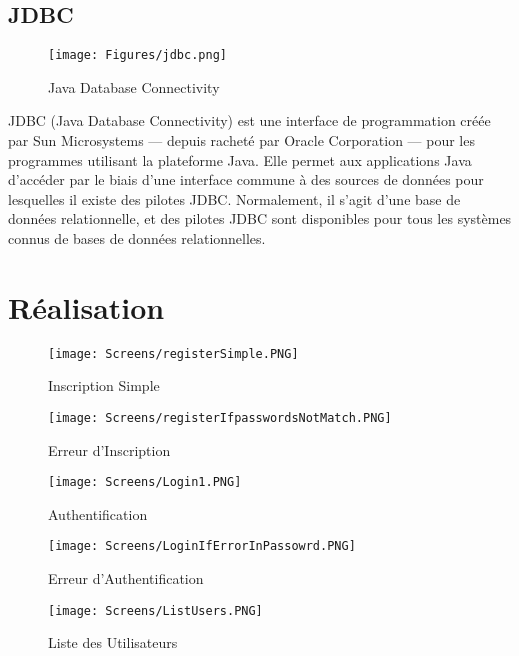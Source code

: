 \vspace{.5cm}
\subsection{JDBC}
\vspace{.5cm}

\begin{figure}[H]
    \centering
    \texttt{[image: Figures/jdbc.png]}
    \caption{Java Database Connectivity}
\end{figure}

JDBC (Java Database Connectivity) est une interface de programmation créée par Sun Microsystems — depuis racheté par Oracle Corporation — pour les programmes utilisant la plateforme Java. Elle permet aux applications Java d'accéder par le biais d'une interface commune à des sources de données pour lesquelles il existe des pilotes JDBC. Normalement, il s'agit d'une base de données relationnelle, et des pilotes JDBC sont disponibles pour tous les systèmes connus de bases de données relationnelles.


\vspace{1cm}
\section{Réalisation}
\vspace{.5cm}

\begin{figure}[H]
    \centering
    \texttt{[image: Screens/registerSimple.PNG]}
    \caption{Inscription Simple}
\end{figure}

\begin{figure}[H]
    \centering
    \texttt{[image: Screens/registerIfpasswordsNotMatch.PNG]}
    \caption{Erreur d'Inscription}
\end{figure}

\begin{figure}[H]
    \centering
    \texttt{[image: Screens/Login1.PNG]}
    \caption{Authentification}
\end{figure}

\begin{figure}[H]
    \centering
    \texttt{[image: Screens/LoginIfErrorInPassowrd.PNG]}
    \caption{Erreur d'Authentification}
\end{figure}

\begin{figure}[H]
    \centering
    \texttt{[image: Screens/ListUsers.PNG]}
    \caption{Liste des Utilisateurs}
\end{figure}

